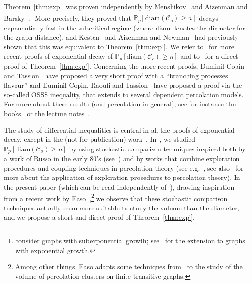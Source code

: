 \documentclass[AHL,Unicode,longabstracts,published]{cedram}
\newcommand{\Pro}{\mathbb{P}}
\newcommand{\calC}{\mathcal{C}}
\newcommand{\diam}{\mathrm{diam}}
\begin{document}
Theorem~\ref{thm:exp'} was proven independently by Menshikov~\cite{Men86} and Aizenman and Barsky~\cite{AB87}.\footnote{\cite{AB87,Men86} consider graphs with subexponential growth; see~\cite{AV08} for the extension to graphs with exponential growth.} More precisely, they proved that $\Pro_p[\diam(\calC_o)\ge n]$ decays exponentially fast in the subcritical regime (where $\diam$ denotes the diameter for the graph distance), and Kesten~\cite{Kes81} and Aizenman and Newman~\cite{AN84} had previously shown that this was equivalent to Theorem~\ref{thm:exp'}. We refer to~\cite{DT16,DT17,DRT19,Van22} for more recent proofs of exponential decay of $\Pro_p[\diam(\calC_o)\ge n]$ and to~\cite{Hut20} for a direct proof of Theorem~\ref{thm:exp'}. Concerning the more recent proofs, Duminil-Copin and Tassion~\cite{DT16,DT17} have proposed a very short proof with a ``branching processes flavour'' and Duminil-Copin, Raoufi and Tassion~\cite{DRT19} have proposed a proof via the so-called OSSS inequality, that extends to several dependent percolation models. For more about these results (and percolation in general), see for instance the books~\cite{Gri99,BR06} or the lecture notes~\cite{Dum17}.



The study of differential inequalities is central in all the proofs of exponential decay, except in the (not for publication) work~\cite{Van22}. In~\cite{Van22}, we studied $\Pro_p[\diam(\calC_o)\ge n]$ by using stochastic comparison techniques inspired both by a work of Russo in the early 80's (see~\cite[Section~3]{Rus82}) and by works that combine exploration procedures and coupling techniques in percolation theory (see e.g.~\cite{DM22}, see also~\cite{GS14} for more about the application of exploration procedures to percolation theory). In the present paper (which can be read independently of~\cite{Van22}), drawing inspiration from a recent work by Easo~\cite{Eas22},\footnote{Among other things, Easo adapts some techniques from~\cite{Van22} to the study of the volume of percolation clusters on finite transitive graphs.} we observe that these stochastic comparison techniques actually seem more suitable to study the volume than the diameter, and we propose a short and direct proof of Theorem~\ref{thm:exp'}.
\end{document}
